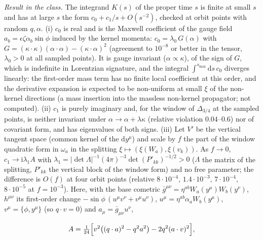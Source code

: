 \emph{Result in the class.} The integrand \(K(s)\) of the proper time \(s\) is finite at small \(s\) and has at large \(s\) the form \(c_0+c_1/s+O(s^{-2})\), checked at orbit points with random \(q,\alpha\). (i) \(c_0\) is real and is the Maxwell coefficient of the gauge field \(a_b=\epsilon\zeta\alpha_b\sin\phi\) induced by the kernel momenta: \(c_0=\lambda_0\,G(\alpha)\) with \(G=(\kappa\cdot\kappa)(\alpha\cdot\alpha)-(\kappa\cdot\alpha)^2\) (agreement to \(10^{-8}\) or better in the tensor, \(\lambda_0>0\) at all sampled points). It is gauge invariant (\(\alpha\propto\kappa\)), of the sign of \(G\), which is indefinite in Lorentzian signature, and the integral \(\int^{s_{\max}}\mathrm ds\,c_0\) diverges linearly: the first-order mass term has no finite local coefficient at this order, and the derivative expansion is expected to be non-uniform at small \(\xi\) of the non-kernel directions (a mass insertion into the massless non-kernel propagator; not computed). (ii) \(c_1\) is purely imaginary and, for the window of \(\Delta_{3/4}\) at the sampled points, is neither invariant under \(\alpha\to\alpha+\lambda\kappa\) (relative violation \(0.04\)--\(0.6\)) nor of covariant form, and has eigenvalues of both signs. (iii) Let \(V'\) be the vertical tangent space (common kernel of the \(\mathrm dy^\mu\)) and scale by \(f\) the part of the window quadratic form in \(\omega_a\) in the splitting \(\xi\mapsto(\xi(W_a),\xi(v_k))\). As \(f\to0\), \(c_1\to\mathrm i\lambda_1 A\) with \(\lambda_1=|\det\Lambda|^{-1}(4\pi)^{-3}\det(P'_{kk})^{-1/2}>0\) (\(\Lambda\) the matrix of the splitting, \(P'_{kk}\) the vertical block of the window form) and no free parameter; the difference is \(O(f)\) at four orbit points (relative \(8\cdot10^{-4}\), \(1.4\cdot10^{-3}\), \(7\cdot10^{-4}\), \(8\cdot10^{-5}\) at \(f=10^{-3}\)). Here, with the base cometric \(\bar g^{\mu\nu}=\eta^{ab}W_a(y^\mu)W_b(y^\nu)\), \(h^{\mu\nu}\) its first-order change \(-\sin\phi\,(u^\mu v^\nu+v^\mu u^\nu)\), \(u^\mu=\eta^{ab}\alpha_aW_b(y^\mu)\), \(v^\mu=\{\phi,y^\mu\}\) (so \(q\cdot v=0\)) and \(a_\mu=\bar g_{\mu\nu}u^\nu\),

\[

A=\tfrac1{24}\Bigl[v^2\bigl((q\cdot a)^2-q^2a^2\bigr)-2q^2(a\cdot v)^2\Bigr],

\]

